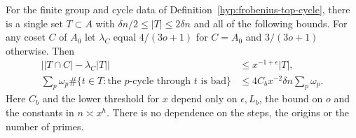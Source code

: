 \begin{proposition}\label{prop:top-set-cycles}
For the finite group and cycle data of Definition~\ref{hyp:frobenius-top-cycle},
there is a single set \(T\subset A\) with
\(\delta n/2\le|T|\le2\delta n\) and all of the following
bounds. For any coset \(C\) of \(A_0\) let \(\lambda_C\)
equal \(4/(3o+1)\) for \(C=A_0\) and \(3/(3o+1)\)
otherwise. Then
\begin{align}
  \big||T\cap C|-\lambda_C|T|\big|
    &\le x^{-1+\epsilon}|T|,\label{eq:coset-shares}\\
  \sum_p\omega_p\#\{t\in T:\text{the }p
           \text{-cycle through }t\text{ is bad}\}
    &\le 4C_bx^{-2}\delta n\sum_p\omega_p .\label{eq:bad-cycles}
\end{align}
Here \(C_b\) and the lower threshold for \(x\) depend only
on \(\epsilon,L_b\), the bound on \(o\) and the constants in
\(n\asymp x^h\). There is no dependence on the steps, the
origins or the number of primes.
\end{proposition}

